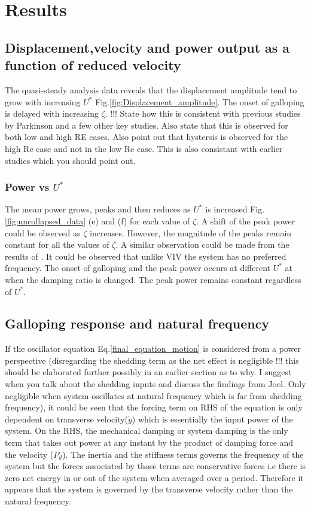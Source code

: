 
\section{Results}


\subsection{Displacement,velocity and power output as a function of reduced velocity}


 The quasi-steady analysis data reveals that the displacement amplitude tend to grow with increasing $U^*$ Fig.\ref{fig:Displacement_amplitude}. The onset of galloping is delayed with increasing $\zeta$.  !!! State how this is consistent with previous studies by Parkinson and a few other key studies. Also state that this is observed for both low and high RE cases. Also point out that hystersis is observed for the high Re case and not in the low Re case. This is also consistant with earlier studies which you should point out.
 
 \subsubsection*{Power vs $U^*$}
 
 The mean power grows, peaks and then reduces as $U^*$ is increased Fig.\ref{fig:uncollapsed_data} (e) and (f) for each value of $\zeta$. A shift of the peak power could be observed as $\zeta$ increases. However, the magnitude of the peaks remain constant for all the values of $\zeta$. A similar observation could be made from the results of \cite{Barrero-Gil2010a}. It could be observed that unlike VIV the  system has no preferred frequency. The onset of galloping and the peak power occurs at different $U^*$ at when the damping ratio is changed. The peak power remains constant regardless of $U^*$.
 
 \subsection{Galloping response and natural frequency}
 
 If the oscillator equation Eq.\eqref{final_equation_motion} is considered from a power perspective (disregarding the shedding term as the net effect is negligible !!! this should be elaborated further possibly in an earlier section as to why. I suggest when you talk about the shedding inputs and discuss the findings from Joel. Only negligible when system oscillates at natural frequency which is far from shedding frequency), it could be seen that the forcing term on RHS of the equation is only dependent on transverse velocity($\dot{y}$) which is essentially the input power of the system. On the RHS, the mechanical damping or system damping is the only term that takes out power at any instant by the product of damping force and the velocity ($P_d$). The inertia and the stiffness terms governs the frequency of the system but the forces associated by those terms are conservative forces i.e there is zero net energy in or out of the system when averaged over a period. Therefore it appears that the system is governed by the transverse velocity rather than the natural frequency.
 

